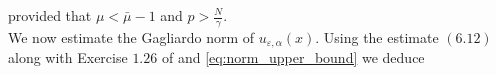 \documentclass[11pt]{article}
\newcommand{\al} {\alpha}
\begin{document}
provided that $\mu < \bar{\mu} -1$ and $p > \frac{N}{\gamma}$. \\

We now estimate the Gagliardo norm of $u_{\varepsilon,\al}(x)$. Using the estimate $(6.12)$ along with Exercise $1.26$ of \cite{giovanni_fractional_book} and \eqref{eq:norm_upper_bound} we deduce
\end{document}
